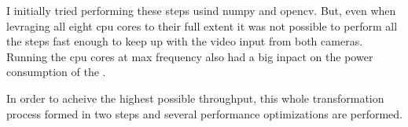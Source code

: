 I initially tried performing these steps usind \gls{numpy} and \gls{opencv}.
But, even when levraging all eight \gls{cpu} cores to their full extent it was not possible to perform all the steps fast enough to keep up with the video input from both cameras.
Running the \gls{cpu} cores at max frequency also had a big inpact on the power consumption of the \jx.

In order to acheive the highest possible throughput, this whole transformation process formed in two steps and several performance optimizations are performed.










